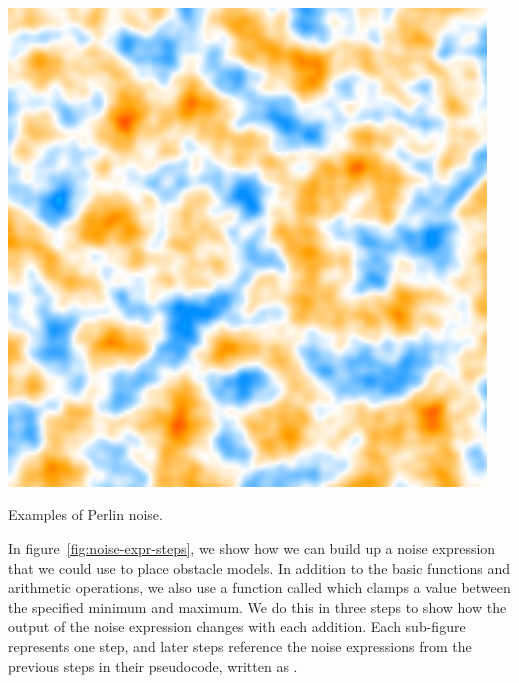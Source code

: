 \begin{center}
\begin{minipage}{.31\textwidth}
        \small{}
    \end{minipage}%
    \begin{minipage}{.31\textwidth}
        \centering
        \includegraphics[width=0.95\textwidth]{img/fractal noise.png}
        \small{}
    \end{minipage}
    \caption{Examples of Perlin noise.}
    \label{fig:noise-funcs}
\end{center}

In figure~\ref{fig:noise-expr-steps}, we show how we can build up a noise expression that we could use to place obstacle models.
In addition to the basic functions and arithmetic operations, we also use a function called  which clamps a value between the specified minimum and maximum.
We do this in three steps to show how the output of the noise expression changes with each addition.
Each sub-figure represents one step, and later steps reference the noise expressions from the previous steps in their pseudocode, written as .

